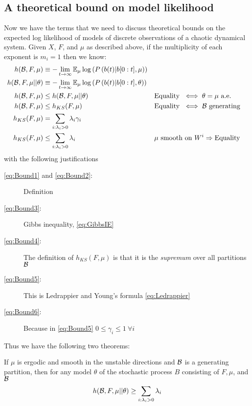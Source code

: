 \subsection{A theoretical bound on model likelihood}
\label{sec:TheoreticalBound}

Now we have the terms that we need to discuss theoretical bounds on
the expected log likelihood of models of discrete observations of a
chaotic dynamical system.  Given $X$, $F$, and $\mu$ as described
above, if the multiplicity of each exponent is $m_i = 1$ then we know:
\begin{align}
  \label{eq:Bound1}
  h({\cal{B}},F,\mu) &\equiv - \lim_{t \rightarrow
    \infty} \EV_\mu \log \left( P \left( \ti{b}{t}|\ts{b}{0}{t}, \mu
    \right) \right) \\
  \label{eq:Bound2}
  h({\cal{B}},F,\mu||\theta) &\equiv - \lim_{t \rightarrow \infty}
  \EV_\mu \log \left( P \left( \ti{b}{t}|\ts{b}{0}{t}, \theta
    \right) \right) \\
  \label{eq:Bound3}
  h({\cal{B}},F,\mu) &\leq h({\cal{B}},F,\mu||\theta)  &&
  \text{Equality } \iff \theta = \mu \text{ a.e.}\\
  \label{eq:Bound4}
  h({\cal{B}},F,\mu) &\leq h_{KS}(F,\mu)  &&
  \text{Equality } \iff {\cal{B}} \text{ generating} \\
  \label{eq:Bound5}
  h_{KS}(F,\mu) &= \sum_{i : \lambda_i > 0} \lambda_i \gamma_i\\
  \label{eq:Bound6}
  h_{KS}(F,\mu) &\leq \sum_{i : \lambda_i > 0} \lambda_i && \mu \text{
  smooth on } W^i \Rightarrow \text{Equality}
\end{align}
with the following justifications
\begin{description}
\item[\eqref{eq:Bound1} {\mdseries and} \eqref{eq:Bound2}:] Definition
\item[\eqref{eq:Bound3}:] Gibbs inequality, \eqref{eq:GibbsIE}
\item[\eqref{eq:Bound4}:] The definition of $h_{KS}(F,\mu)$ is that it is the
  \emph{supremum} over all partitions ${\cal{B}}$
\item[\eqref{eq:Bound5}:] This is Ledrappier and Young's formula
  \eqref{eq:Ledrappier}
\item[\eqref{eq:Bound6}:] Because in \eqref{eq:Bound5} $0 \leq \gamma_i \leq
  1~ \forall i$
\end{description}
Thus we have the following two theorems:
\begin{theorem}
  If $\mu$ is ergodic and smooth in the unstable directions and
  $\cal{B}$ is a generating partition, then for any model $\theta$ of
  the stochastic process $B$ consisting of $F,\mu$, and $\cal{B}$
  \begin{equation}
    \label{eq:BoundTheorem}
    h({\cal{B}},F,\mu||\theta) \geq \sum_{i : \lambda_i > 0} \lambda_i
  \end{equation}
\end{theorem}
